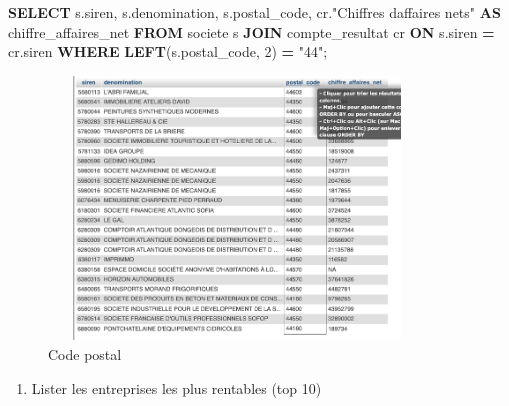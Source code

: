 \documentclass[mstat,12pt]{unswthesis}
\newenvironment{Shaded}{\begin{snugshade}}{\end{snugshade}}
\newcommand{\DecValTok}[1]{\textcolor[rgb]{0.00,0.00,0.81}{#1}}
\newcommand{\KeywordTok}[1]{\textcolor[rgb]{0.13,0.29,0.53}{\textbf{#1}}}
\newcommand{\NormalTok}[1]{#1}
\newcommand{\OperatorTok}[1]{\textcolor[rgb]{0.81,0.36,0.00}{\textbf{#1}}}
\newcommand{\OtherTok}[1]{\textcolor[rgb]{0.56,0.35,0.01}{#1}}
\begin{document}
\begin{Shaded}
\begin{Highlighting}[]
\KeywordTok{SELECT} 
\NormalTok{    s.siren,}
\NormalTok{    s.denomination,}
\NormalTok{    s.postal\_code,}
\NormalTok{    cr.}\OtherTok{"Chiffres d\textquotesingle{}affaires nets"} \KeywordTok{AS}\NormalTok{ chiffre\_affaires\_net}
\KeywordTok{FROM} 
\NormalTok{    societe s}
\KeywordTok{JOIN} 
\NormalTok{    compte\_resultat cr }\KeywordTok{ON}\NormalTok{ s.siren }\OperatorTok{=}\NormalTok{ cr.siren}
\KeywordTok{WHERE} 
    \KeywordTok{LEFT}\NormalTok{(s.postal\_code, }\DecValTok{2}\NormalTok{) }\OperatorTok{=} \OtherTok{"44"}\NormalTok{;}
\end{Highlighting}
\end{Shaded}

\begin{figure}
\centering
\includegraphics[width=10cm,height=7cm]{image_sql/sql_2_serdar.png}
\caption{Code postal}
\end{figure}

\newpage

\begin{enumerate}
\def\labelenumi{\arabic{enumi})}
\setcounter{enumi}{2}
\tightlist
\item
  Lister les entreprises les plus rentables (top 10)
\end{enumerate}

\medskip
\end{document}
